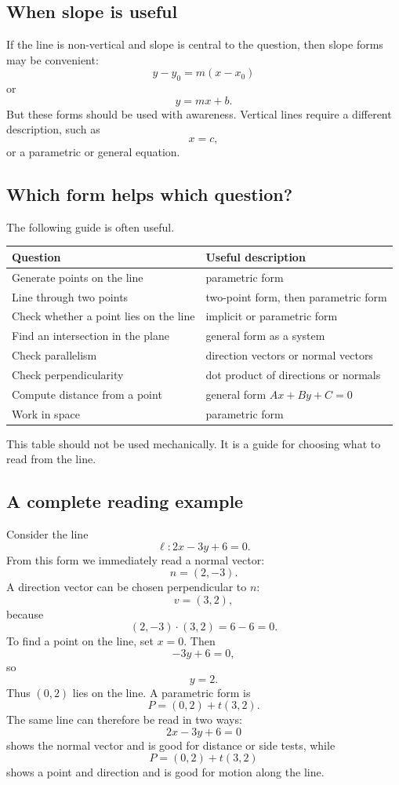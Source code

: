 \subsection*{When slope is useful}

If the line is non-vertical and slope is central to the question, then slope forms may be convenient:
\[
y-y_0=m(x-x_0)
\]
or
\[
y=mx+b.
\]
But these forms should be used with awareness. Vertical lines require a different description, such as
\[
x=c,
\]
or a parametric or general equation.

\subsection*{Which form helps which question?}

The following guide is often useful.

\begin{center}
\begin{tabular}{ll}
\toprule
Question & Useful description \\
\midrule
Generate points on the line & parametric form \\
Line through two points & two-point form, then parametric form \\
Check whether a point lies on the line & implicit or parametric form \\
Find an intersection in the plane & general form as a system \\
Check parallelism & direction vectors or normal vectors \\
Check perpendicularity & dot product of directions or normals \\
Compute distance from a point & general form \(Ax+By+C=0\) \\
Work in space & parametric form \\
\bottomrule
\end{tabular}
\end{center}

This table should not be used mechanically. It is a guide for choosing what to read from the line.

\subsection*{A complete reading example}

Consider the line
\[
\ell: 2x-3y+6=0.
\]
From this form we immediately read a normal vector:
\[
n=(2,-3).
\]
A direction vector can be chosen perpendicular to \(n\):
\[
v=(3,2),
\]
because
\[
(2,-3)\cdot(3,2)=6-6=0.
\]
To find a point on the line, set \(x=0\). Then
\[
-3y+6=0,
\]
so
\[
y=2.
\]
Thus \((0,2)\) lies on the line. A parametric form is
\[
P=(0,2)+t(3,2).
\]
The same line can therefore be read in two ways:
\[
2x-3y+6=0
\]
shows the normal vector and is good for distance or side tests, while
\[
P=(0,2)+t(3,2)
\]
shows a point and direction and is good for motion along the line.

